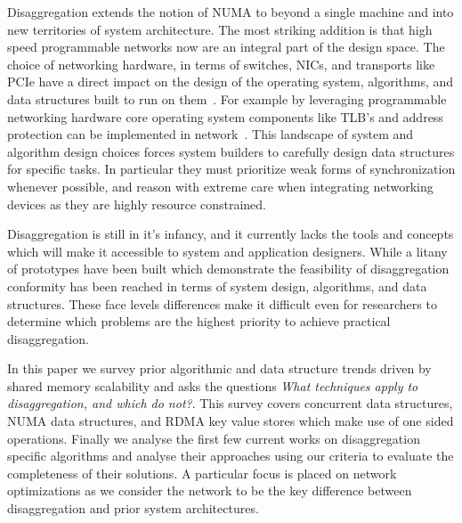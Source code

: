 Disaggregation extends the notion of NUMA to beyond a single machine and into
new territories of system architecture. The most striking addition is that high
speed programmable networks now are an integral part of the design space. The
choice of networking hardware, in terms of switches, NICs, and transports like
PCIe have a direct impact on the design of the operating system, algorithms, and
data structures built to run on
them~\cite{dredbox,firebox,machine,legoos,supernic}. For example by leveraging
programmable networking hardware core operating system components like TLB's and
address protection can be implemented in network~\cite{mind}.  This landscape of
system and algorithm design choices forces system builders to carefully design
data structures for specific tasks.  In particular they must prioritize weak
forms of synchronization whenever possible, and reason with extreme care when
integrating networking devices as they are highly resource constrained.


Disaggregation is still in it's infancy, and it currently lacks the tools and
concepts which will make it accessible to system and application designers.
While a litany of prototypes have been built which demonstrate the feasibility
of
disaggregation~\cite{infiniswap,fastswap,leap,legoos,aifm,kona,reigons,sotware-far,lite,semeru}
conformity has been reached in terms of system design, algorithms, and data
structures. These face levels differences make it difficult even for researchers
to determine which problems are the highest priority to achieve practical
disaggregation.

In this paper we survey prior algorithmic and data structure trends driven by
shared memory scalability and asks the questions \textit{What techniques apply
to disaggregation, and which do not?}. This survey covers concurrent data
structures, NUMA data structures, and RDMA key value stores which make use of
one sided operations.  Finally we analyse the first few current works on
disaggregation specific algorithms and analyse their approaches using our
criteria to evaluate the completeness of their solutions.  A particular focus is
placed on network optimizations as we consider the network to be the key
difference between disaggregation and prior system architectures.

